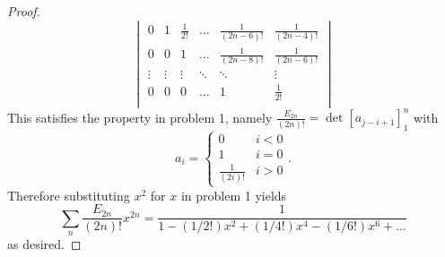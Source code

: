 \documentclass{article}
\begin{document}
\begin{proof}
\[\begin{vmatrix}
      0            & 1            & \frac{1}{2!}         & \hdots & \frac{1}{(2n-6)!}         & \frac{1}{(2n-4)!} \\
      0            & 0            & 1                    & \hdots & \frac{1}{(2n-8)!}         & \frac{1}{(2n-6)!} \\
      \vdots       & \vdots       & \vdots               & \ddots & \ddots                    & \vdots \\
      0            & 0            & 0                    & \hdots & 1                         & \frac{1}{2!}\\
    \end{vmatrix}
  \]
  This satisfies the property in problem 1, namely
  $\displaystyle \frac{E_{2n}}{(2n)!} = \det[a_{j-i+1}]_1^n$ with \[
    a_i = \begin{cases}
      0 & i < 0 \\
      1 & i = 0 \\
      \displaystyle\frac{1}{(2i)!} & i > 0
    \end{cases}.
  \]
  Therefore substituting $x^2$ for $x$ in problem 1 yields \[
    \sum_n \frac{E_{2n}}{(2n)!}x^{2n}
    = \frac{1}{1 - (1/2!)x^2 + (1/4!)x^4 - (1/6!)x^6 + \hdots}
  \] as desired.
\end{proof}
\pagebreak
\end{document}
